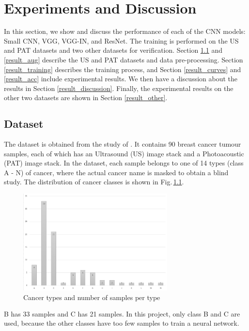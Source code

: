 \chapter{Experiments and Discussion} 
\label{experiments}
In this section, we show and discuss the performance of each of the CNN models: Small CNN, VGG, VGG-IN, and ResNet. The training is performed on the US and PAT datasets and two other datasets for verification. Section \ref{result_dataset} and \ref{result_aug} describe the US and PAT datasets and data pre-processing. Section \ref{result_training} describes the training process, and Section \ref{result_curves} and \ref{result_acc} include experimental results. We then have a discussion about the results in Section \ref{result_discussion}. Finally, the experimental results on the other two datasets are shown in Section \ref{result_other}.
\section{Dataset}
\label{result_dataset}
The dataset is obtained from the study of \cite{Kosik2019}. It contains 90 breast cancer tumour samples, each of which has an Ultrasound (US) image stack and a Photoacoustic (PAT) image stack. In the dataset, each sample belongs to one of 14 types (class A - N) of cancer, where the actual cancer name is masked to obtain a blind study. The distribution of cancer classes is shown in Fig.\,\ref{class_graph}.  
\begin{figure}[h]
	\centering
	\includegraphics[width=0.7\textwidth]{Figs/class_graph.png}
    \caption{Cancer types and number of samples per type}
    \label{class_graph}
\end{figure}

B has 33 samples and C has 21 samples. In this project, only class B and C are used, because the other classes have too few samples to train a neural network.

